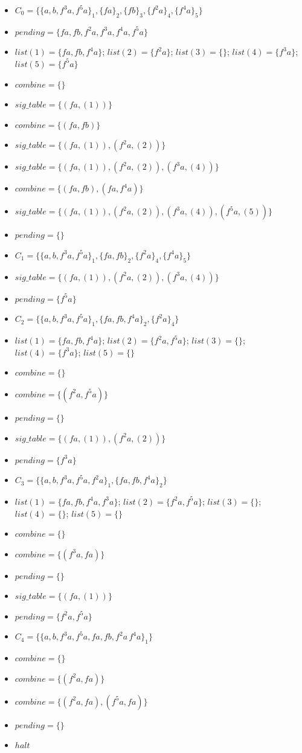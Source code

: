 \begin{itemize}
  \item $C_0 = \{ \{a, b, f^3 a, f^5 a\}_1 ,\{f a\}_2 ,\{f b\}_3 ,\{f^2 a\}_4 ,\{f^4 a\}_5\}$
  \item $pending = \{f a, f b, f^2 a, f^3 a, f^4 a, f^5 a\}$
  \item $list(1) = \{f a, f b, f^4 a\}$; $list(2) = \{f^2 a\}$; $list(3) = \{\}$; $list(4) = \{f^3 a\}$; $list(5) = \{f^ 5 a\}$
  \item $combine = \{\}$
  \item $sig\_table = \{(f a, (1))\}$
  \item $combine = \{(f a, f b)\}$
  \item $sig\_table = \{(f a , (1)), (f^2 a , (2) )\}$
  \item $sig\_table = \{(f a , (1)), (f^2 a , (2) ), (f^3 a, (4))\}$
  \item $combine = \{(fa, fb), (fa, f^4 a)\}$
  \item $sig\_table = \{(f a , (1)), (f^2 a , (2) ), (f^3 a, (4)), (f^5 a, (5))\}$
  \item $pending = \{\}$
  \item $C_1 = \{\{a, b, f^3 a, f^5 a\}_1 ,\{f a, f b\}_2  ,\{f^2 a\}_4 ,\{f^4 a\}_5\}$
  \item $sig\_table = \{(f a , (1)), (f^2 a , (2) ), (f^3 a, (4))\}$
  \item $pending = \{f^5 a\}$
  \item $C_2 = \{\{a, b, f^3 a, f^5 a\}_1 ,\{f a, f b, f^4 a\}_2  ,\{f^2 a\}_4 \}$
  \item $list(1) = \{f a, f b, f^4 a\}$; $list(2) = \{f^2 a, f^5 a\}$; $list(3) = \{\}$; $list(4) = \{f^3 a\}$; $list(5) = \{\}$
  \item $combine = \{\}$
  \item $combine = \{(f^2 a, f^5 a)\}$
  \item $pending = \{\}$
  \item $sig\_table = \{(fa, (1)), (f^2 a, (2))\}$
  \item $pending = \{f ^ 3 a\}$
  \item $C_3 = \{\{a, b, f^3 a, f^5 a, f^2 a\}_1 ,\{f a, f b, f^4 a\}_2\}$
  \item $list(1) = \{f a, f b, f^4 a, f^3 a\}$; $list(2) = \{f^2 a, f^5 a\}$; $list(3) = \{\}$; $list(4) = \{\}$; $list(5) = \{\}$
  \item $combine = \{\}$
  \item $combine = \{(f^3 a, f a)\}$
  \item $pending = \{\}$
  \item $sig\_table = \{(fa, (1))\}$
  \item $pending = \{f^2 a, f^5 a\}$
  \item $C_4 = \{\{a, b, f^3 a, f^5 a, f a, f b, f^2 a\, f^4 a\}_1\}$
  \item $combine = \{\}$
  \item $combine = \{(f^2 a, f a)\}$
  \item $combine = \{(f^2 a, f a), (f^5 a, f a)\}$
  \item $pending = \{\}$
  \item $halt$
\end{itemize}